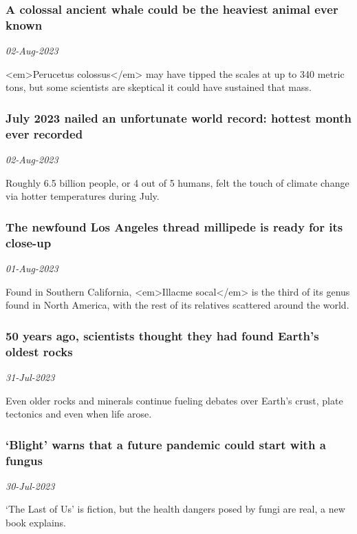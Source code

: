 \subsubsection{A colossal ancient whale could be the heaviest animal ever known \href{https://www.sciencenews.org/article/colossal-ancient-whale-heaviest-animal}{}}
\textit{02-Aug-2023}

<em>Perucetus colossus</em> may have tipped the scales at up to 340 metric tons, but some scientists are skeptical it could have sustained that mass.
\subsubsection{July 2023 nailed an unfortunate world record: hottest month ever recorded \href{https://www.sciencenews.org/article/july-2023-just-unfortunate-world-record-hot}{}}
\textit{02-Aug-2023}

Roughly 6.5 billion people, or 4 out of 5 humans, felt the touch of climate change via hotter temperatures during July.
\subsubsection{The newfound Los Angeles thread millipede is ready for its close-up \href{https://www.sciencenews.org/article/new-los-angeles-thread-millipede}{}}
\textit{01-Aug-2023}

Found in Southern California, <em>Illacme socal</em> is the third of its genus found in North America, with the rest of its relatives scattered around the world.
\subsubsection{50 years ago, scientists thought they had found Earth’s oldest rocks \href{https://www.sciencenews.org/article/50-years-ago-earth-oldest-rocks}{}}
\textit{31-Jul-2023}

Even older rocks and minerals continue fueling debates over Earth’s crust, plate tectonics and even when life arose.
\subsubsection{‘Blight’ warns that a future pandemic could start with a fungus \href{https://www.sciencenews.org/article/blight-future-pandemic-fungus-book}{}}
\textit{30-Jul-2023}

‘The Last of Us’ is fiction, but the health dangers posed by fungi are real, a new book explains.
